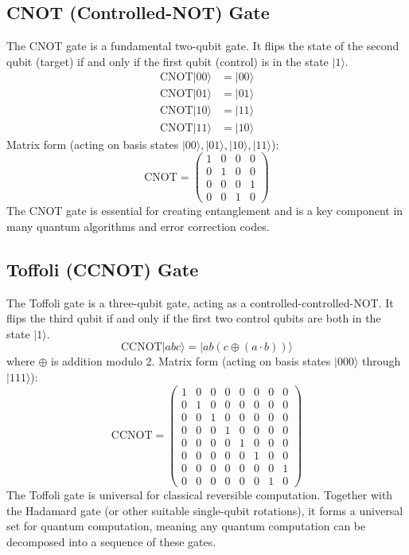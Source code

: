 \subsection*{CNOT (Controlled-NOT) Gate}
The CNOT gate is a fundamental two-qubit gate. It flips the state of the second qubit (target) if and only if the first qubit (control) is in the state $|1\rangle$.
\begin{align*}
    \text{CNOT}|00\rangle &= |00\rangle \\
    \text{CNOT}|01\rangle &= |01\rangle \\
    \text{CNOT}|10\rangle &= |11\rangle \\
    \text{CNOT}|11\rangle &= |10\rangle
\end{align*}
Matrix form (acting on basis states $|00\rangle, |01\rangle, |10\rangle, |11\rangle$):
\begin{equation*}
    \text{CNOT} = \begin{pmatrix} 1 & 0 & 0 & 0 \\ 0 & 1 & 0 & 0 \\ 0 & 0 & 0 & 1 \\ 0 & 0 & 1 & 0 \end{pmatrix}
\end{equation*}
The CNOT gate is essential for creating entanglement and is a key component in many quantum algorithms and error correction codes.

\subsection*{Toffoli (CCNOT) Gate}
The Toffoli gate is a three-qubit gate, acting as a controlled-controlled-NOT. It flips the third qubit if and only if the first two control qubits are both in the state $|1\rangle$.
\begin{equation*}
    \text{CCNOT}|abc\rangle = |ab(c\oplus(a\cdot b))\rangle
\end{equation*}
where $\oplus$ is addition modulo 2.
Matrix form (acting on basis states $|000\rangle$ through $|111\rangle$):
\begin{equation*}
    \text{CCNOT} = \begin{pmatrix}
    1&0&0&0&0&0&0&0 \\
    0&1&0&0&0&0&0&0 \\
    0&0&1&0&0&0&0&0 \\
    0&0&0&1&0&0&0&0 \\
    0&0&0&0&1&0&0&0 \\
    0&0&0&0&0&1&0&0 \\
    0&0&0&0&0&0&0&1 \\ %
    0&0&0&0&0&0&1&0  %
    \end{pmatrix}
\end{equation*}
The Toffoli gate is universal for classical reversible computation. Together with the Hadamard gate (or other suitable single-qubit rotations), it forms a universal set for quantum computation, meaning any quantum computation can be decomposed into a sequence of these gates.

